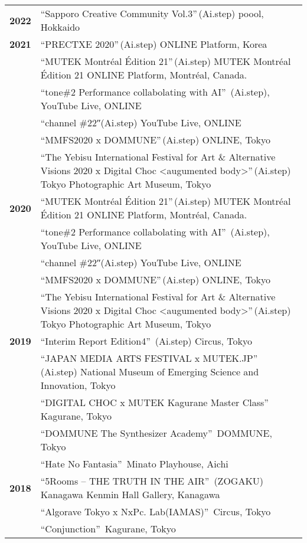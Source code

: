 \documentclass[8pt,a4paper]{article}
\begin{document}
\begin{longtable}{@{}p{1.2cm}@{\hspace{0.5cm}}p{14cm}@{}}
\textbf{2022} & ``Sapporo Creative Community Vol.3''\,(Ai.step) poool, Hokkaido \\[0.2em]
\textbf{2021} & ``PRECTXE 2020''\,(Ai.step) ONLINE Platform, Korea \\
& ``MUTEK Montréal Édition 21''\,(Ai.step) MUTEK Montréal Édition 21 ONLINE Platform, Montréal, Canada. \\
& ``tone\#2 Performance collabolating with AI''\, (Ai.step), YouTube Live, ONLINE \\
& ``channel \#22″(Ai.step) YouTube Live, ONLINE \\
& ``MMFS2020 x DOMMUNE''\,(Ai.step) ONLINE, Tokyo \\
& ``The Yebisu International Festival for Art \& Alternative Visions 2020 x Digital Choc <augumented body>''\,(Ai.step) Tokyo Photographic Art Museum, Tokyo \\[0.2em]
\textbf{2020} & ``MUTEK Montréal Édition 21''\,(Ai.step) MUTEK Montréal Édition 21 ONLINE Platform, Montréal, Canada. \\
& ``tone\#2 Performance collabolating with AI''\, (Ai.step), YouTube Live, ONLINE \\
& ``channel \#22″(Ai.step) YouTube Live, ONLINE \\
& ``MMFS2020 x DOMMUNE''\,(Ai.step) ONLINE, Tokyo \\
& ``The Yebisu International Festival for Art \& Alternative Visions 2020 x Digital Choc <augumented body>''\,(Ai.step) Tokyo Photographic Art Museum, Tokyo \\[0.2em]
\textbf{2019} & ``Interim Report Edition4''\, (Ai.step) Circus, Tokyo \\
& ``JAPAN MEDIA ARTS FESTIVAL x MUTEK.JP''\, (Ai.step) National Museum of Emerging Science and Innovation, Tokyo \\
& ``DIGITAL CHOC x MUTEK Kagurane Master Class''\, Kagurane, Tokyo \\
& ``DOMMUNE The Synthesizer Academy''\, DOMMUNE, Tokyo \\
& ``Hate No Fantasia''\, Minato Playhouse, Aichi \\[0.2em]
\textbf{2018} & ``5Rooms – THE TRUTH IN THE AIR''\, (ZOGAKU) Kanagawa Kenmin Hall Gallery, Kanagawa \\
& ``Algorave Tokyo x NxPc. Lab(IAMAS)''\, Circus, Tokyo \\
& ``Conjunction''\, Kagurane, Tokyo \\

\end{longtable}
\end{document}

